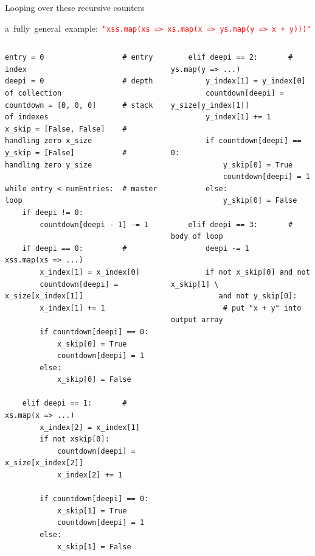 \documentclass{beamer}
\begin{document}
\begin{frame}[fragile]{Looping over these recursive counters}
\begin{center}
\scriptsize \mbox{\hspace{-1 cm}a fully general example: \textcolor{red}{\tt "xss.map(xs => xs.map(x => ys.map(y => x + y)))"}\hspace{-1 cm}}
\end{center}

\vspace{-0.5 cm}
\makebox[\linewidth]{\rule{\paperwidth}{0.3pt}}

\vspace{-0.5 cm}
\begin{columns}[t]
\tiny
\begin{verbatim}
entry = 0                  # entry index
deepi = 0                  # depth of collection
countdown = [0, 0, 0]      # stack of indexes
x_skip = [False, False]    # handling zero x_size
y_skip = [False]           # handling zero y_size

while entry < numEntries:  # master loop
    if deepi != 0:
        countdown[deepi - 1] -= 1

    if deepi == 0:         # xss.map(xs => ...)
        x_index[1] = x_index[0]
        countdown[deepi] = x_size[x_index[1]]
        x_index[1] += 1

        if countdown[deepi] == 0:
            x_skip[0] = True
            countdown[deepi] = 1
        else:
            x_skip[0] = False

    elif deepi == 1:       # xs.map(x => ...)
        x_index[2] = x_index[1]
        if not xskip[0]:
            countdown[deepi] = x_size[x_index[2]]
            x_index[2] += 1

        if countdown[deepi] == 0:
            x_skip[1] = True
            countdown[deepi] = 1
        else:
            x_skip[1] = False
\end{verbatim}
\tiny
\begin{verbatim}
    elif deepi == 2:       # ys.map(y => ...)
        y_index[1] = y_index[0]
        countdown[deepi] = y_size[y_index[1]]
        y_index[1] += 1

        if countdown[deepi] == 0:
            y_skip[0] = True
            countdown[deepi] = 1
        else:
            y_skip[0] = False

    elif deepi == 3:       # body of loop
        deepi -= 1

        if not x_skip[0] and not x_skip[1] \
           and not y_skip[0]:
            # put "x + y" into output array


\end{verbatim}
\end{columns}
\end{frame}
\end{document}
